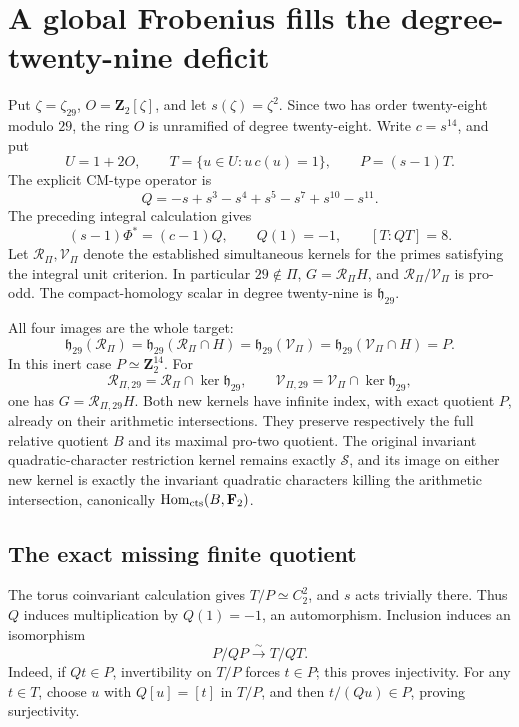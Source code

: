 \section{A global Frobenius fills the degree-twenty-nine deficit}
\label{sec:global-frobenius-29}

Put \(\zeta=\zeta_{29}\), \(O=\mathbf Z_2[\zeta]\), and let
\(s(\zeta)=\zeta^2\). Since two has order twenty-eight modulo
\(29\), the ring \(O\) is unramified of degree twenty-eight.
Write \(c=s^{14}\), and put
\[
 U=1+2O,\qquad T=\{u\in U:u\,c(u)=1\},\qquad P=(s-1)T.
\]
The explicit CM-type operator is
\[
 Q=-s+s^3-s^4+s^5-s^7+s^{10}-s^{11}.
\]
The preceding integral calculation gives
\[
 (s-1)\Phi^*=(c-1)Q,\qquad Q(1)=-1,\qquad [T:QT]=8.
\]
Let \(\mathcal R_\Pi,\mathcal V_\Pi\) denote the established simultaneous kernels
for the primes satisfying the integral unit criterion. In particular
\(29\notin\Pi\), \(G=\mathcal R_\Pi H\), and \(\mathcal R_\Pi/\mathcal V_\Pi\) is
pro-odd. The compact-homology scalar in degree twenty-nine is
\(\mathfrak h_{29}\).

\begin{theorem}\label{thm:global-frobenius-29}
All four images are the whole target:
\[
 \mathfrak h_{29}(\mathcal R_\Pi)=\mathfrak h_{29}(\mathcal R_\Pi\cap H)
 =\mathfrak h_{29}(\mathcal V_\Pi)=\mathfrak h_{29}(\mathcal V_\Pi\cap H)=P.
\]
In this inert case \(P\simeq\mathbf Z_2^{14}\).
For
\[
 \mathcal R_{\Pi,29}=\mathcal R_\Pi\cap\ker\mathfrak h_{29},\qquad
 \mathcal V_{\Pi,29}=\mathcal V_\Pi\cap\ker\mathfrak h_{29},
\]
one has \(G=\mathcal R_{\Pi,29}H\). Both new kernels have infinite
index, with exact quotient \(P\), already on their arithmetic
intersections. They preserve respectively the full relative quotient
\(B\) and its maximal pro-two quotient. The original invariant
quadratic-character restriction kernel remains exactly \(\mathcal S\), and
its image on either new kernel is exactly the invariant quadratic
characters killing the arithmetic intersection, canonically
\(\operatorname{Hom}_{\rm cts}(B,\mathbf F_2)\).
\end{theorem}

\subsection{The exact missing finite quotient}

The torus coinvariant calculation gives \(T/P\simeq C_2^2\),
and \(s\) acts trivially there. Thus \(Q\) induces multiplication
by \(Q(1)=-1\), an automorphism. Inclusion induces an isomorphism
\begin{equation}\label{eq:g29-cokernel-identification}
                         P/QP\xrightarrow{\sim}T/QT.
\end{equation}
Indeed, if \(Qt\in P\), invertibility on \(T/P\) forces
\(t\in P\); this proves injectivity. For any \(t\in T\),
choose \(u\) with \(Q[u]=[t]\) in \(T/P\), and then
\(t/(Qu)\in P\), proving surjectivity.

